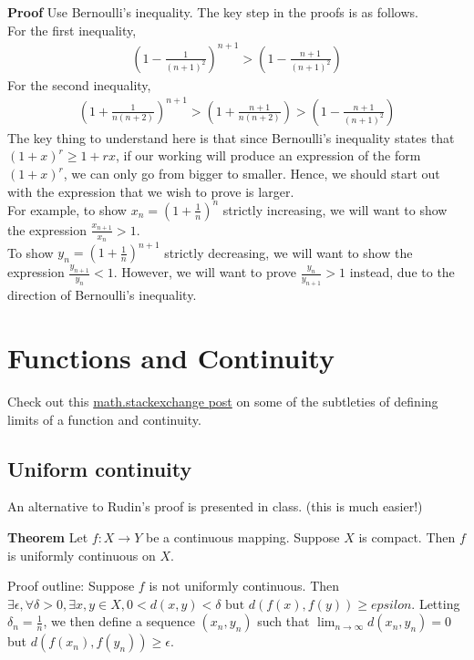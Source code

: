 \documentclass{article}
\begin{document}
\textbf{Proof} Use Bernoulli's inequality. The key step in the proofs is as follows.\\
For the first inequality,
\begin{align*}
	\left(1-\frac{1}{(n+1)^2}\right)^{n+1} > \left(1-\frac{n+1}{(n+1)^2}\right)
\end{align*}
For the second inequality,
\begin{align*}
	\left(1+\frac{1}{n(n+2)}\right)^{n+1} > \left(1+\frac{n+1}{n(n+2)}\right) > \left(1-\frac{n+1}{(n+1)^2}\right)
\end{align*}
The key thing to understand here is that since Bernoulli's inequality states that $(1+x)^r\geq 1+rx$, if our working will produce an expression of the form  $(1+x)^r$, we can only go from bigger to smaller. Hence, we should start out with the expression that we wish to prove is larger.\\
For example, to show $x_n=(1+\frac{1}{n})^n$ strictly increasing, we will want to show the expression $\frac{x_{n+1}}{x_n}>1$.\\
To show $y_n=(1+\frac{1}{n})^{n+1}$ strictly decreasing, we will want to show the expression $\frac{y_{n+1}}{y_n}<1$. However, we will want to prove $\frac{y_{n}}{y_{n+1}}>1$ instead, due to the direction of Bernoulli's inequality.


\section{Functions and Continuity}
Check out this \href{https://math.stackexchange.com/questions/455296/can-a-function-with-just-one-point-in-its-domain-be-continuous}{math.stackexchange post} on some of the subtleties of defining limits of a function and continuity. 


\subsection{Uniform continuity}
An alternative to Rudin's proof is presented in class. (this is much easier!)

\textbf{Theorem} Let $f:X\rightarrow Y$ be a continuous mapping. Suppose $X$ is compact. Then $f$ is uniformly continuous on $X$.


Proof outline:
Suppose $f$ is not uniformly continuous. Then $\exists \epsilon, \forall \delta>0, \exists x,y\in X, 0<d(x,y)<\delta \text{ but } d(f(x), f(y)) \geq epsilon$. Letting $\delta_n=\frac{1}{n}$, we then define a sequence $(x_n,y_n)$ such that $\lim_{n\rightarrow \infty}d(x_n,y_n)=0$ but $d(f(x_n), f(y_n)) \geq \epsilon$.
\end{document}
